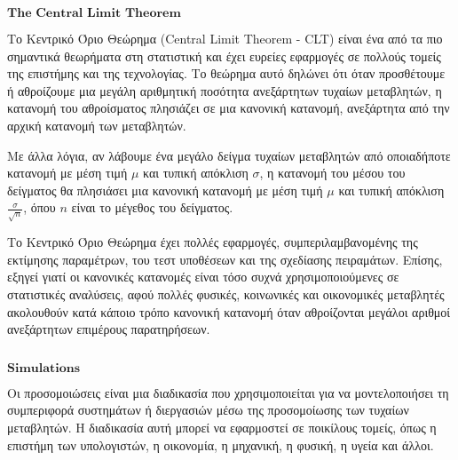 \documentclass[11pt]{article}
\makeatletter
\newcommand{\boxspacing}{\kern\kvtcb@left@rule\kern\kvtcb@boxsep}
\newcommand{\prompt}[4]{
        {\ttfamily\llap{{\color{#2}[#3]:\hspace{3pt}#4}}\vspace{-\baselineskip}}
    }
\makeatother
\begin{document}
    \begin{tcolorbox}[breakable, size=fbox, boxrule=1pt, pad at break*=1mm,colback=cellbackground, colframe=cellborder]
\prompt{In}{incolor}{ }{\boxspacing}
\begin{Verbatim}[commandchars=\\\{\}]

\end{Verbatim}
\end{tcolorbox}

    \(\textbf{The Central Limit Theorem}\)

    Το Κεντρικό Όριο Θεώρημα (Central Limit Theorem - CLT) είναι ένα από τα
πιο σημαντικά θεωρήματα στη στατιστική και έχει ευρείες εφαρμογές σε
πολλούς τομείς της επιστήμης και της τεχνολογίας. Το θεώρημα αυτό
δηλώνει ότι όταν προσθέτουμε ή αθροίζουμε μια μεγάλη αριθμητική ποσότητα
ανεξάρτητων τυχαίων μεταβλητών, η κατανομή του αθροίσματος πλησιάζει σε
μια κανονική κατανομή, ανεξάρτητα από την αρχική κατανομή των
μεταβλητών.

Με άλλα λόγια, αν λάβουμε ένα μεγάλο δείγμα τυχαίων μεταβλητών από
οποιαδήποτε κατανομή με μέση τιμή $ \mu $ και τυπική απόκλιση $
\sigma $, η κατανομή του μέσου του δείγματος θα πλησιάσει μια κανονική
κατανομή με μέση τιμή $ \mu $ και τυπική απόκλιση $
\frac{\sigma}{\sqrt{n}} $, όπου $ n $ είναι το μέγεθος του δείγματος.

Το Κεντρικό Όριο Θεώρημα έχει πολλές εφαρμογές, συμπεριλαμβανομένης της
εκτίμησης παραμέτρων, του τεστ υποθέσεων και της σχεδίασης πειραμάτων.
Επίσης, εξηγεί γιατί οι κανονικές κατανομές είναι τόσο συχνά
χρησιμοποιούμενες σε στατιστικές αναλύσεις, αφού πολλές φυσικές,
κοινωνικές και οικονομικές μεταβλητές ακολουθούν κατά κάποιο τρόπο
κανονική κατανομή όταν αθροίζονται μεγάλοι αριθμοί ανεξάρτητων επιμέρους
παρατηρήσεων.

    \begin{tcolorbox}[breakable, size=fbox, boxrule=1pt, pad at break*=1mm,colback=cellbackground, colframe=cellborder]
\prompt{In}{incolor}{ }{\boxspacing}
\begin{Verbatim}[commandchars=\\\{\}]

\end{Verbatim}
\end{tcolorbox}

    \(\textbf{Simulations}\)

    Οι προσομοιώσεις είναι μια διαδικασία που χρησιμοποιείται για να
μοντελοποιήσει τη συμπεριφορά συστημάτων ή διεργασιών μέσω της
προσομοίωσης των τυχαίων μεταβλητών. Η διαδικασία αυτή μπορεί να
εφαρμοστεί σε ποικίλους τομείς, όπως η επιστήμη των υπολογιστών, η
οικονομία, η μηχανική, η φυσική, η υγεία και άλλοι.
\end{document}
